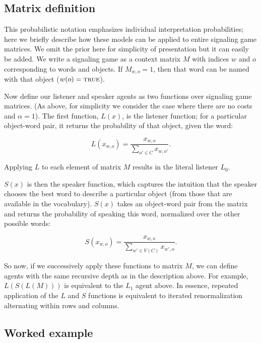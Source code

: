 \documentclass[man]{apa6}
\begin{document}
\subsection{Matrix definition}

This probabilistic notation emphasizes individual interpretation probabilities; here we briefly describe how these models can be applied to entire signaling game matrices. We omit the prior here for simplicity of presentation but it can easily be added. We write a signaling game as a context matrix $M$ with indices $w$ and $o$ corresponding to words and objects. If $M_{w,o} = 1$, then that word can be named with that object ($w(o) = \textsc{true}$).

Now define our listener and speaker agents as two functions over signaling game matrices. (As above, for simplicity we consider the case where there are no costs and $\alpha=1$). The first function, $L(x)$, is the listener function; for a particular object-word pair, it returns the probability of that object, given the word:

\begin{equation}
  \label{eq:lmatrix}
L(x_{w,o}) = \frac{x_{w,o}}{\displaystyle\sum_{o' \in C} x_{w,o'} }.
\end{equation}

\noindent Applying $L$ to each element of matrix $M$ results in the literal listener $L_0$.

$S(x)$ is then the speaker function, which captures the intuition that the speaker chooses the best word to describe a particular object (from those that are available in the vocabulary). $S(x)$ takes an object-word pair from the matrix and returns the probability of speaking this word, normalized over the other possible words:

\begin{equation}
  \label{eq:smatrix}
S(x_{w,o}) = \frac{x_{w,o}}{\displaystyle \sum_{w' \in V(C)} x_{w',o}}.
\end{equation}

So now, if we successively apply these functions to matrix $M$, we can define agents with the same recursive depth as in the description above. For example, $L(S(L(M)))$ is equivalent to the $L_1$ agent above. In essence, repeated application of the $L$ and $S$ functions is equivalent to iterated renormalization alternating within rows and columns.

\subsection{Worked example}
\end{document}
